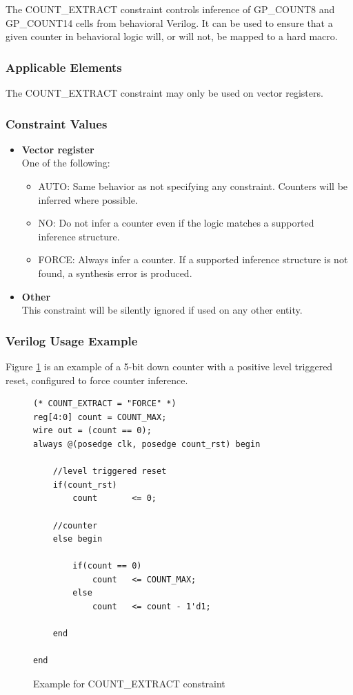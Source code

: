 \documentclass{article}
\begin{document}
The COUNT\_EXTRACT constraint controls inference of GP\_COUNT8 and GP\_COUNT14 cells from behavioral Verilog. It can be 
used to ensure that a given counter in behavioral logic will, or will not, be mapped to a hard macro.

\subsubsection{Applicable Elements}
The COUNT\_EXTRACT constraint may only be used on vector registers.

\subsubsection{Constraint Values}
\begin{itemize}
\item {\bfseries Vector register}\\
One of the following:
\begin{itemize}
\item AUTO: Same behavior as not specifying any constraint. Counters will be inferred where possible.
\item NO: Do not infer a counter even if the logic matches a supported inference structure.
\item FORCE: Always infer a counter. If a supported inference structure is not found, a synthesis error is produced.
\end{itemize}
\item {\bfseries Other} \\
This constraint will be silently ignored if used on any other entity.
\end{itemize}

\clearpage
\subsubsection{Verilog Usage Example}

Figure \ref{constraint-count-extract} is an example of a 5-bit down counter with a positive level triggered reset, 
configured to force counter inference.

\begin{figure}[h]
\begin{lstlisting}
(* COUNT_EXTRACT = "FORCE" *)
reg[4:0] count = COUNT_MAX;
wire out = (count == 0);
always @(posedge clk, posedge count_rst) begin
	
	//level triggered reset
	if(count_rst)
		count		<= 0;
	
	//counter
	else begin

		if(count == 0)
			count	<= COUNT_MAX;
		else
			count	<= count - 1'd1;

	end
	
end
\end{lstlisting}
\caption{Example for COUNT\_EXTRACT constraint}
\label{constraint-count-extract}
\end{figure}
\end{document}
